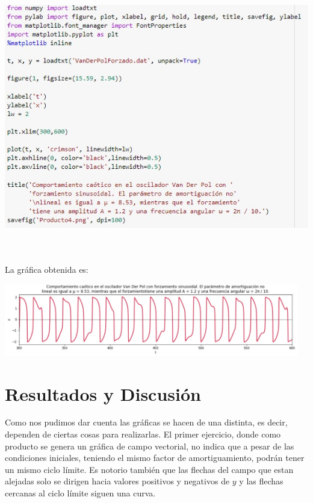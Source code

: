 \documentclass[12pt]{article}
\begin{document}
\begin{center}
    \includegraphics[height=12cm]{O8.jpeg}\\
\end{center}
\newpage
La gráfica obtenida es:
\begin{center}
    \includegraphics[height=3.15cm]{1.jpeg}\\
\end{center}




\section*{Resultados y Discusión}
Como nos pudimos dar cuenta las gráficas se hacen de una distinta, es decir, dependen de ciertas cosas para realizarlas.
El primer ejercicio, donde como producto se genera un gráfica de campo vectorial, no indica que a pesar de las condiciones iniciales, teniendo el mismo factor de amortiguamiento, podrán tener un mismo ciclo límite. Es notorio también que las flechas del campo que estan alejadas solo se dirigen hacia valores positivos y negativos de $y$ y las flechas cercanas al ciclo límite siguen una curva.
\end{document}
